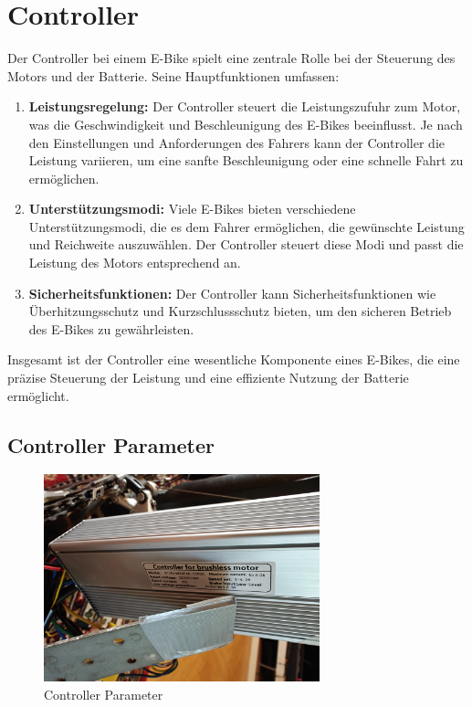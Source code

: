 
\chapter{Controller}
Der Controller bei einem E-Bike spielt eine zentrale Rolle bei der Steuerung des Motors und der Batterie. Seine Hauptfunktionen umfassen:

\begin{enumerate}
  \item \textbf{Leistungsregelung:} Der Controller steuert die Leistungszufuhr zum Motor, was die Geschwindigkeit und Beschleunigung des E-Bikes beeinflusst. Je nach den Einstellungen und Anforderungen des Fahrers kann der Controller die Leistung variieren, um eine sanfte Beschleunigung oder eine schnelle Fahrt zu ermöglichen.

  \item \textbf{Unterstützungsmodi:} Viele E-Bikes bieten verschiedene Unterstützungsmodi, die es dem Fahrer ermöglichen, die gewünschte Leistung und Reichweite auszuwählen. Der Controller steuert diese Modi und passt die Leistung des Motors entsprechend an.

  \item \textbf{Sicherheitsfunktionen:} Der Controller kann Sicherheitsfunktionen wie Überhitzungsschutz und Kurzschlussschutz bieten, um den sicheren Betrieb des E-Bikes zu gewährleisten.
\end{enumerate}

Insgesamt ist der Controller eine wesentliche Komponente eines E-Bikes, die eine präzise Steuerung der Leistung und eine effiziente Nutzung der Batterie ermöglicht.

\section{Controller Parameter}
\begin{figure}[h]
  \centering
  \includegraphics[width=8cm]{images/Controller.jpg}
  \caption{Controller Parameter\cite{lorenz_scherrer_selbst_2023}}%
  \label{fig:17}
\end{figure}

